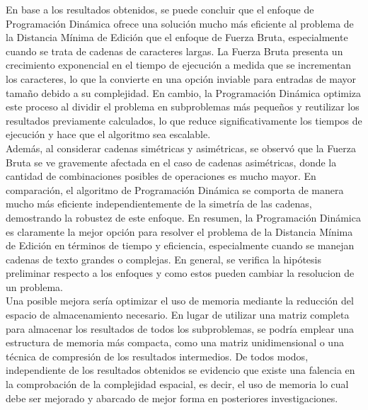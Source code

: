 En base a los resultados obtenidos, se puede concluir que el enfoque de Programación Dinámica ofrece una solución mucho más eficiente al problema de la Distancia Mínima de Edición que el enfoque de Fuerza Bruta, especialmente cuando se trata de cadenas de caracteres largas. La Fuerza Bruta presenta un crecimiento exponencial en el tiempo de ejecución a medida que se incrementan los caracteres, lo que la convierte en una opción inviable para entradas de mayor tamaño debido a su complejidad. En cambio, la Programación Dinámica optimiza este proceso al dividir el problema en subproblemas más pequeños y reutilizar los resultados previamente calculados, lo que reduce significativamente los tiempos de ejecución y hace que el algoritmo sea escalable.\\

Además, al considerar cadenas simétricas y asimétricas, se observó que la Fuerza Bruta se ve gravemente afectada en el caso de cadenas asimétricas, donde la cantidad de combinaciones posibles de operaciones es mucho mayor. En comparación, el algoritmo de Programación Dinámica se comporta de manera mucho más eficiente independientemente de la simetría de las cadenas, demostrando la robustez de este enfoque. En resumen, la Programación Dinámica es claramente la mejor opción para resolver el problema de la Distancia Mínima de Edición en términos de tiempo y eficiencia, especialmente cuando se manejan cadenas de texto grandes o complejas. En general, se verifica la hipótesis preliminar respecto a los enfoques y como estos pueden cambiar la resolucion de un problema.\\

Una posible mejora sería optimizar el uso de memoria mediante la reducción del espacio de almacenamiento necesario. En lugar de utilizar una matriz completa para almacenar los resultados de todos los subproblemas, se podría emplear una estructura de memoria más compacta, como una matriz unidimensional o una técnica de compresión de los resultados intermedios. De todos modos, independiente de los resultados obtenidos se evidencio que existe una falencia en la comprobación de la complejidad espacial, es decir, el uso de memoria lo cual debe ser mejorado y abarcado de mejor forma en posteriores investigaciones.